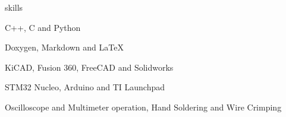 \begin{section}{skills}

\begin{skills}

  \item {} {C++, C and Python}
  \item {} {Doxygen, Markdown and \LaTeX}
  \item {} {KiCAD, Fusion 360, FreeCAD and Solidworks}
  \item {} {STM32 Nucleo, Arduino and TI Launchpad}
  \item {} {Oscilloscope and Multimeter operation, Hand Soldering and Wire Crimping}

\end{skills}

\end{section}

